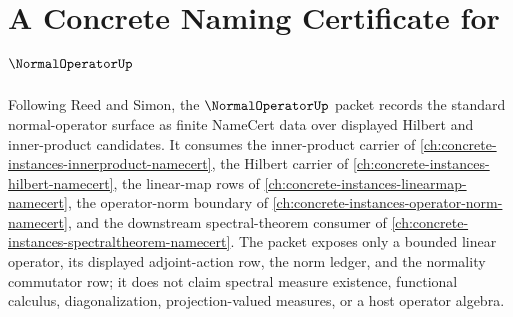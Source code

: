 \chapter{A Concrete Naming Certificate for $\NormalOperatorUp$}
\label{ch:concrete-instances-normal-operator-namecert}

Following Reed and Simon, the $\NormalOperatorUp$ packet records the standard normal-operator surface as finite NameCert data over displayed Hilbert and inner-product candidates. It consumes the inner-product carrier of \autoref{ch:concrete-instances-innerproduct-namecert}, the Hilbert carrier of \autoref{ch:concrete-instances-hilbert-namecert}, the linear-map rows of \autoref{ch:concrete-instances-linearmap-namecert}, the operator-norm boundary of \autoref{ch:concrete-instances-operator-norm-namecert}, and the downstream spectral-theorem consumer of \autoref{ch:concrete-instances-spectraltheorem-namecert}. The packet exposes only a bounded linear operator, its displayed adjoint-action row, the norm ledger, and the normality commutator row; it does not claim spectral measure existence, functional calculus, diagonalization, projection-valued measures, or a host operator algebra.


